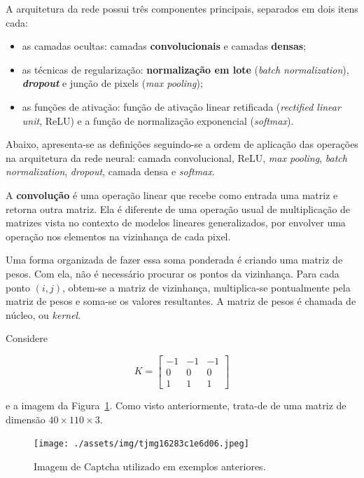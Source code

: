 \documentclass[12pt,twoside,brazilian]{book}
\providecommand{\tightlist}{%
  \setlength{\itemsep}{0pt}\setlength{\parskip}{0pt}}
\begin{document}
A arquitetura da rede possui três componentes principais, separados em
dois itens cada:

\begin{itemize}
\tightlist
\item
  as camadas ocultas: camadas \textbf{convolucionais} e camadas
  \textbf{densas};
\item
  as técnicas de regularização: \textbf{normalização em lote}
  (\emph{batch normalization}), \textbf{\emph{dropout}} e junção de
  pixels (\emph{max pooling});
\item
  as funções de ativação: função de ativação linear retificada
  (\emph{rectified linear unit}, ReLU) e a função de normalização
  exponencial (\emph{softmax}).
\end{itemize}

Abaixo, apresenta-se as definições seguindo-se a ordem de aplicação das
operações na arquitetura da rede neural: camada convolucional, ReLU,
\emph{max pooling}, \emph{batch normalization}, \emph{dropout}, camada
densa e \emph{softmax}.

A \textbf{convolução} é uma operação linear que recebe como entrada uma
matriz e retorna outra matriz. Ela é diferente de uma operação usual de
multiplicação de matrizes vista no contexto de modelos lineares
generalizados, por envolver uma operação nos elementos na vizinhança de
cada pixel.

Uma forma organizada de fazer essa soma ponderada é criando uma matriz
de pesos. Com ela, não é necessário procurar os pontos da vizinhança.
Para cada ponto \((i,j)\), obtem-se a matriz de vizinhança,
multiplica-se pontualmente pela matriz de pesos e soma-se os valores
resultantes. A matriz de pesos é chamada de núcleo, ou \emph{kernel}.

Considere

\[
K = \left[\begin{array}{rrr}-1&-1&-1\\0&0&0\\1&1&1\end{array}\right]
\]

e a imagem da Figura~\ref{fig-tjmg-exemplo-conv}. Como visto
anteriormente, trata-de de uma matriz de dimensão
\(40\times110\times3\).

\begin{figure}

{\centering \texttt{[image: ./assets/img/tjmg16283c1e6d06.jpeg]}

}

\caption{\label{fig-tjmg-exemplo-conv}Imagem de Captcha utilizado em
exemplos anteriores.}

\end{figure}
\end{document}
